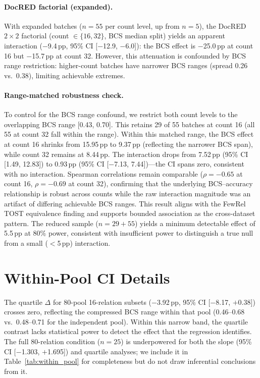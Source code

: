 \documentclass[11pt]{article}
\begin{document}
\paragraph{DocRED factorial (expanded).}
With expanded batches ($n{=}55$ per count level, up from $n{=}5$), the DocRED $2 \times 2$ factorial (count $\in \{16, 32\}$, BCS median split) yields an apparent interaction ($-$9.4\,pp, 95\% CI [$-$12.9, $-$6.0]): the BCS effect is $-$25.0\,pp at count 16 but $-$15.7\,pp at count 32. However, this attenuation is confounded by BCS range restriction: higher-count batches have narrower BCS ranges (spread 0.26 vs.\ 0.38), limiting achievable extremes.

\paragraph{Range-matched robustness check.}
To control for the BCS range confound, we restrict both count levels to the overlapping BCS range [0.43, 0.70]. This retains 29 of 55 batches at count 16 (all 55 at count 32 fall within the range). Within this matched range, the BCS effect at count 16 shrinks from 15.95\,pp to 9.37\,pp (reflecting the narrower BCS span), while count 32 remains at 8.44\,pp. The interaction drops from 7.52\,pp (95\% CI [1.49, 12.83]) to 0.93\,pp (95\% CI [$-$7.13, 7.44])---the CI spans zero, consistent with no interaction. Spearman correlations remain comparable ($\rho = -0.65$ at count 16, $\rho = -0.69$ at count 32), confirming that the underlying BCS--accuracy relationship is robust across counts while the raw interaction magnitude was an artifact of differing achievable BCS ranges. This result aligns with the FewRel TOST equivalence finding and supports bounded association as the cross-dataset pattern. The reduced sample ($n = 29{+}55$) yields a minimum detectable effect of 5.5\,pp at 80\% power, consistent with insufficient power to distinguish a true null from a small ($<$5\,pp) interaction.

\section{Within-Pool CI Details}
\label{sec:appendix_within_pool}

The quartile $\Delta$ for 80-pool 16-relation subsets ($-$3.92\,pp, 95\% CI [$-$8.17, $+$0.38]) crosses zero, reflecting the compressed BCS range within that pool (0.46--0.68 vs.\ 0.48--0.71 for the independent pool). Within this narrow band, the quartile contrast lacks statistical power to detect the effect that the regression identifies. The full 80-relation condition ($n = 25$) is underpowered for both the slope (95\% CI [$-$1.303, $+$1.695]) and quartile analyses; we include it in Table~\ref{tab:within_pool} for completeness but do not draw inferential conclusions from it.
\end{document}
